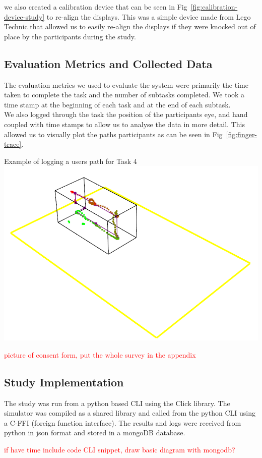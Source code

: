 we also created a calibration device that can be seen in Fig~\ref{fig:calibration-device-study} to re-align the displays. This was a simple device made from Lego Technic \tocite that allowed us to easily re-align the displays if they were knocked out of place by the participants during the study.

\subsection{Evaluation Metrics and Collected Data}
The evaluation metrics we used to evaluate the system were primarily the time taken to complete the task and the number of subtasks completed. We took a time stamp at the beginning of each task and at the end of each subtask. \\

We also logged through the task the position of the participants eye, and hand coupled with time stamps to allow us to analyse the data in more detail. This allowed us to visually plot the paths participants as can be seen in Fig~\ref{fig:finger-trace}. \\


\begin{figureBox}[label={fig:finger-trace}, width=0.8\linewidth]{Example of logging a users path for Task 4}
    \includegraphics[width = 0.8\linewidth]{./implementation/figures/finger-trace-plot.png}
\end{figureBox}

\textcolor{red}{picture of consent form, put the whole survey in the appendix}

\subsection{Study Implementation}

The study was run from a python based CLI using the Click library. The simulator was compiled as a shared library and called from the python CLI using a C-FFI (foreign function interface). The results and logs were received from python in json format and stored in a mongoDB database.

\textcolor{red}{if have time include code CLI snippet, draw basic diagram with mongodb?}
